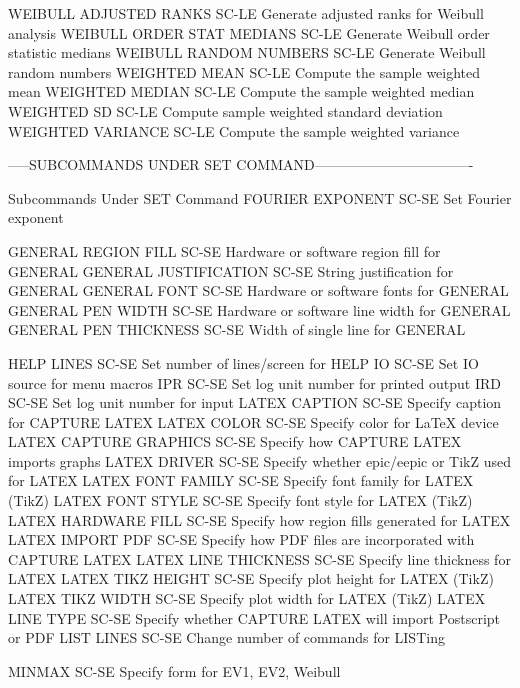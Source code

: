 WEIBULL ADJUSTED RANKS      SC-LE Generate adjusted ranks for Weibull analysis
WEIBULL ORDER STAT MEDIANS  SC-LE Generate Weibull order statistic medians
WEIBULL RANDOM NUMBERS      SC-LE Generate Weibull random numbers
WEIGHTED MEAN               SC-LE Compute the sample weighted mean
WEIGHTED MEDIAN             SC-LE Compute the sample weighted median
WEIGHTED SD                 SC-LE Compute sample weighted standard deviation
WEIGHTED VARIANCE           SC-LE Compute the sample weighted variance

-----SUBCOMMANDS UNDER SET COMMAND----------------------------------

Subcommands Under SET Command
FOURIER EXPONENT            SC-SE Set Fourier exponent

GENERAL REGION FILL         SC-SE Hardware or software region fill for GENERAL
GENERAL JUSTIFICATION       SC-SE String justification for GENERAL
GENERAL FONT                SC-SE Hardware or software fonts for GENERAL
GENERAL PEN WIDTH           SC-SE Hardware or software line width for GENERAL
GENERAL PEN THICKNESS       SC-SE Width of single line for GENERAL

HELP LINES                  SC-SE Set number of lines/screen for HELP
IO                          SC-SE Set IO source for menu macros
IPR                         SC-SE Set log unit number for printed output
IRD                         SC-SE Set log unit number for input
LATEX CAPTION               SC-SE Specify caption for CAPTURE LATEX
LATEX COLOR                 SC-SE Specify color for LaTeX device
LATEX CAPTURE GRAPHICS      SC-SE Specify how CAPTURE LATEX imports graphs
LATEX DRIVER                SC-SE Specify whether epic/eepic or TikZ used for LATEX
LATEX FONT FAMILY           SC-SE Specify font family for LATEX (TikZ)
LATEX FONT STYLE            SC-SE Specify font style for LATEX (TikZ)
LATEX HARDWARE FILL         SC-SE Specify how region fills generated for LATEX
LATEX IMPORT PDF            SC-SE Specify how PDF files are incorporated with CAPTURE LATEX
LATEX LINE THICKNESS        SC-SE Specify line thickness for LATEX
LATEX TIKZ HEIGHT           SC-SE Specify plot height for LATEX (TikZ)
LATEX TIKZ WIDTH            SC-SE Specify plot width for LATEX (TikZ)
LATEX LINE TYPE             SC-SE Specify whether CAPTURE LATEX will import Postscript or PDF
LIST LINES                  SC-SE Change number of commands for LISTing

MINMAX                      SC-SE Specify form for EV1, EV2, Weibull

